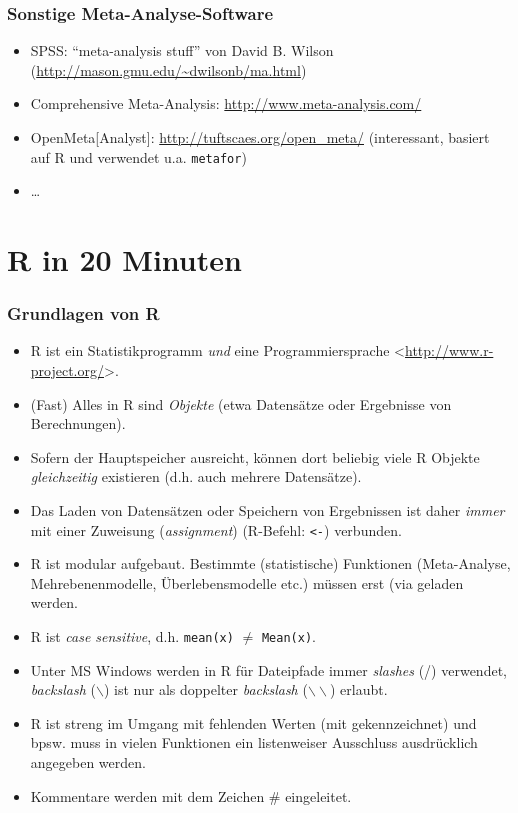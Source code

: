 \begin{frame}\frametitle{Sonstige Meta-Analyse-Software}
  \begin{itemize}
   \item SPSS: "`meta-analysis stuff"' von David B. Wilson (\url{http://mason.gmu.edu/~dwilsonb/ma.html})
   \item Comprehensive Meta-Analysis: \url{http://www.meta-analysis.com/}
   \item OpenMeta[Analyst]: \url{http://tuftscaes.org/open_meta/} (interessant,
     basiert auf R und verwendet u.a. \texttt{metafor})
  \item \ldots
  \end{itemize}
\end{frame}




\section{R in 20 Minuten}

\begin{frame}[plain]\frametitle{Grundlagen von R}
  \begin{footnotesize}
    \begin{itemize}
    \item R ist ein Statistikprogramm \emph{und} eine Programmiersprache <\url{http://www.r-project.org/}>.
    \item (Fast) Alles in R sind \emph{Objekte} (etwa Datensätze oder Ergebnisse
      von Berechnungen).
    \item Sofern der Hauptspeicher ausreicht, können dort beliebig viele R
      Objekte \emph{gleichzeitig} existieren (d.h. auch mehrere Datensätze).
    \item Das Laden von Datensätzen oder Speichern von Ergebnissen ist daher
      \emph{immer} mit einer Zuweisung (\emph{assignment}) (R-Befehl: \lstinline|<-|)
      verbunden.
    \item R ist modular aufgebaut. Bestimmte (statistische) Funktionen
      (Meta-Analyse, Mehrebenenmodelle, Überlebensmodelle etc.) müssen erst (via
       geladen werden.
    \item R ist \emph{case sensitive}, d.h. \texttt{mean(x)} $\neq$ \texttt{Mean(x)}.
    \item Unter MS Windows werden in R für Dateipfade immer \emph{slashes} (/)
      verwendet, \emph{backslash} ($\backslash$) ist nur als doppelter
      \emph{backslash} ($\backslash\backslash$) erlaubt.
    \item R ist streng im Umgang mit fehlenden Werten (mit 
      gekennzeichnet) und bpsw. muss in vielen Funktionen ein listenweiser Ausschluss ausdrücklich angegeben werden.
    \item Kommentare werden mit dem Zeichen \# eingeleitet.
    \end{itemize}
  \end{footnotesize}
\end{frame}





